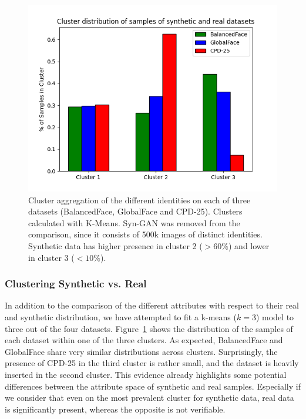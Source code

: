 \documentclass[a4paper, 10pt, conference]{ieeeconf}      %
\begin{document}
\begin{figure}
    \centering
    \includegraphics[width=1.05\linewidth]{cluster_datasets.png}
    \caption{Cluster aggregation of the different identities on each of three datasets (BalancedFace, GlobalFace and CPD-25). Clusters calculated with K-Means. Syn-GAN was removed from the comparison, since it consists of 500k images of distinct identities.  Synthetic data has higher presence in cluster 2 ($>60\%$) and lower in cluster 3 ($<10\%$).}
    \label{fig:cluster_datasets}
\end{figure}

\subsubsection{Clustering Synthetic vs. Real}

In addition to the comparison of the different attributes with respect to their real and synthetic distribution, we have attempted to fit a k-means ($k=3$) model to three out of the four datasets. Figure~\ref{fig:cluster_datasets} shows the distribution of the samples of each dataset within one of the three clusters. As expected, BalancedFace and GlobalFace share very similar distributions across clusters. Surprisingly, the presence of CPD-25 in the third cluster is rather small, and the dataset is heavily inserted in the second cluster. This evidence already highlights some potential differences between the attribute space of synthetic and real samples. Especially if we consider that even on the most prevalent cluster for synthetic data, real data is significantly present, whereas the opposite is not verifiable.
\end{document}
